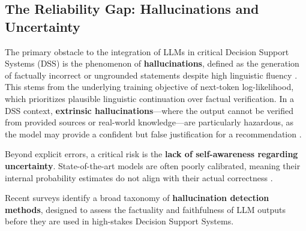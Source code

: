 \subsection{The Reliability Gap: Hallucinations and Uncertainty}
The primary obstacle to the integration of LLMs in critical Decision Support Systems (DSS) is the phenomenon of \textbf{hallucinations}, defined as the generation of factually incorrect or ungrounded statements despite high linguistic fluency \cite{ji2023survey}. 
This stems from the underlying training objective of next-token log-likelihood, which prioritizes plausible linguistic continuation over factual verification. In a DSS context, \textbf{extrinsic hallucinations}—where the output cannot be verified from provided sources or real-world knowledge—are particularly hazardous, as the model may provide a confident but false justification for a recommendation \cite{Survey2025}.

Beyond explicit errors, a critical risk is the \textbf{lack of self-awareness regarding uncertainty}. State-of-the-art models are often poorly calibrated, meaning their internal probability estimates do not align with their actual correctness \cite{jiang2021can}.

Recent surveys \cite{alansari2025large} identify a broad taxonomy of \textbf{hallucination detection methods}, designed to assess the factuality and faithfulness of LLM outputs before they are used in high-stakes Decision Support Systems.

